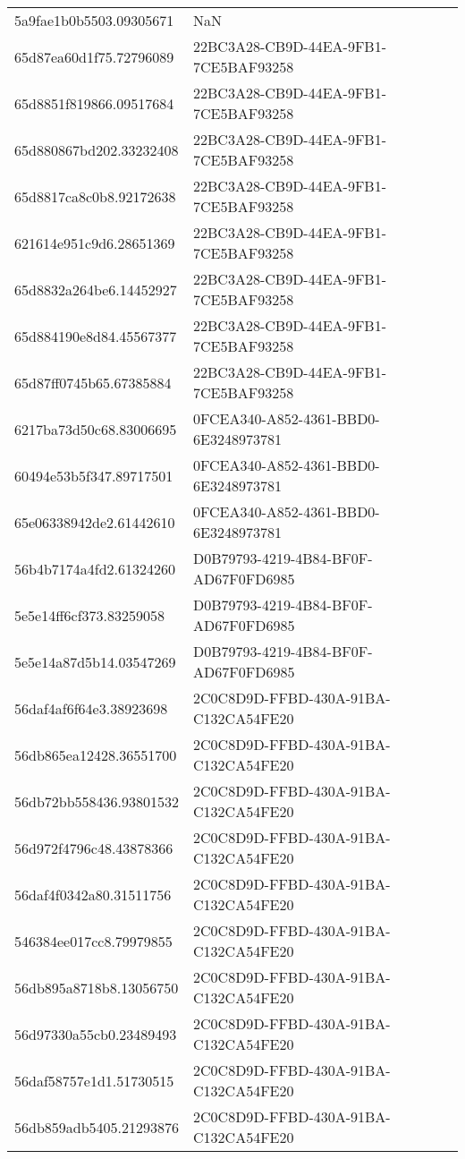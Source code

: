 \begin{tabular}{ll}
5a9fae1b0b5503.09305671 & NaN \\
65d87ea60d1f75.72796089 & 22BC3A28-CB9D-44EA-9FB1-7CE5BAF93258 \\
65d8851f819866.09517684 & 22BC3A28-CB9D-44EA-9FB1-7CE5BAF93258 \\
65d880867bd202.33232408 & 22BC3A28-CB9D-44EA-9FB1-7CE5BAF93258 \\
65d8817ca8c0b8.92172638 & 22BC3A28-CB9D-44EA-9FB1-7CE5BAF93258 \\
621614e951c9d6.28651369 & 22BC3A28-CB9D-44EA-9FB1-7CE5BAF93258 \\
65d8832a264be6.14452927 & 22BC3A28-CB9D-44EA-9FB1-7CE5BAF93258 \\
65d884190e8d84.45567377 & 22BC3A28-CB9D-44EA-9FB1-7CE5BAF93258 \\
65d87ff0745b65.67385884 & 22BC3A28-CB9D-44EA-9FB1-7CE5BAF93258 \\
6217ba73d50c68.83006695 & 0FCEA340-A852-4361-BBD0-6E3248973781 \\
60494e53b5f347.89717501 & 0FCEA340-A852-4361-BBD0-6E3248973781 \\
65e06338942de2.61442610 & 0FCEA340-A852-4361-BBD0-6E3248973781 \\
56b4b7174a4fd2.61324260 & D0B79793-4219-4B84-BF0F-AD67F0FD6985 \\
5e5e14ff6cf373.83259058 & D0B79793-4219-4B84-BF0F-AD67F0FD6985 \\
5e5e14a87d5b14.03547269 & D0B79793-4219-4B84-BF0F-AD67F0FD6985 \\
56daf4af6f64e3.38923698 & 2C0C8D9D-FFBD-430A-91BA-C132CA54FE20 \\
56db865ea12428.36551700 & 2C0C8D9D-FFBD-430A-91BA-C132CA54FE20 \\
56db72bb558436.93801532 & 2C0C8D9D-FFBD-430A-91BA-C132CA54FE20 \\
56d972f4796c48.43878366 & 2C0C8D9D-FFBD-430A-91BA-C132CA54FE20 \\
56daf4f0342a80.31511756 & 2C0C8D9D-FFBD-430A-91BA-C132CA54FE20 \\
546384ee017cc8.79979855 & 2C0C8D9D-FFBD-430A-91BA-C132CA54FE20 \\
56db895a8718b8.13056750 & 2C0C8D9D-FFBD-430A-91BA-C132CA54FE20 \\
56d97330a55cb0.23489493 & 2C0C8D9D-FFBD-430A-91BA-C132CA54FE20 \\
56daf58757e1d1.51730515 & 2C0C8D9D-FFBD-430A-91BA-C132CA54FE20 \\
56db859adb5405.21293876 & 2C0C8D9D-FFBD-430A-91BA-C132CA54FE20 \\

\end{tabular}
